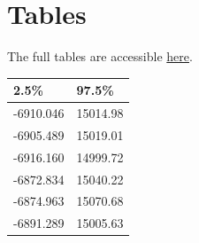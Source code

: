 \documentclass[11pt, oneside]{article}
\begin{document}
\section*{Tables}
The full tables are accessible \href{https://github.com/thetruejacob/CS112/blob/master/Assignment/Assignment\%202.ipynb}{here}.
\begin{table}[h]
\begin{tabular}{|l|l|}
\hline
\textbf{2.5\%} & \textbf{97.5\%} \\ \hline
-6910.046      & 15014.98        \\ \hline
-6905.489      & 15019.01        \\ \hline
-6916.160      & 14999.72        \\ \hline
-6872.834      & 15040.22        \\ \hline
-6874.963      & 15070.68        \\ \hline
-6891.289      & 15005.63        \\ \hline
\end{tabular}
\end{table}
\end{document}
